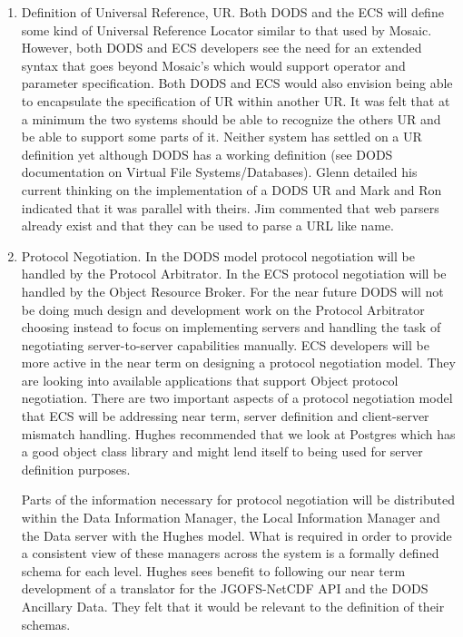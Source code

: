 \begin{enumerate}
   \item  Definition of Universal Reference, UR.  Both DODS and the ECS will
   define some kind of Universal Reference Locator similar to that
   used by Mosaic.  However, both DODS and ECS developers see the need for an
   extended syntax that goes beyond Mosaic's which would support operator and
   parameter specification.  Both DODS and ECS would also envision being able
   to encapsulate the specification of UR within another UR.  It was felt
   that at a minimum the two systems should be able to recognize the others
   UR and be able to support some parts of it.  Neither system has settled on
   a UR definition yet although DODS has a working definition (see DODS
   documentation on Virtual File Systems/Databases).  Glenn detailed his
   current thinking on the implementation of a DODS UR and Mark and Ron
   indicated that it was parallel with theirs.  Jim commented that web
   parsers already exist and that they can be used to parse a URL like name. 

   \item Protocol Negotiation.  In the DODS model protocol negotiation will
   be handled by the Protocol Arbitrator.  In the ECS protocol negotiation
   will be handled by the Object Resource Broker.  For the near future DODS
   will not be doing much design and development work on the Protocol
   Arbitrator choosing instead to focus on implementing servers and handling
   the task of negotiating server-to-server capabilities manually.  ECS
   developers will be more active in the near term on designing a protocol
   negotiation model.  They are looking into available applications that
   support Object protocol negotiation.  There are two important aspects of a
   protocol negotiation model that ECS will be addressing near term, server
   definition and client-server mismatch handling.   Hughes recommended that
   we look at Postgres which has a good object class library and might lend
   itself to being used for server definition purposes. 

   Parts of the information necessary for protocol negotiation will be
   distributed within the Data Information Manager, the Local Information
   Manager and the Data server with the Hughes model.  What is required in
   order to provide a consistent view of these managers across the system is
   a formally defined schema for each level.  Hughes sees benefit to
   following our near term development of a translator for the JGOFS-NetCDF
   API and the DODS Ancillary Data.  They felt that it would be relevant to
   the definition of their schemas.


\end{enumerate}
